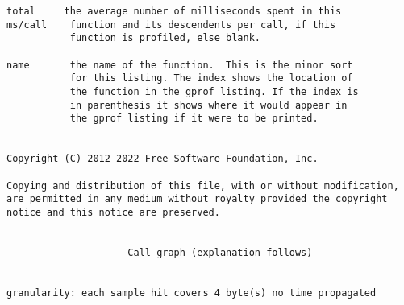 \documentclass[12pt]{article}
\begin{document}
\begin{lstlisting}[breaklines]
 total     the average number of milliseconds spent in this
ms/call    function and its descendents per call, if this
           function is profiled, else blank.

name       the name of the function.  This is the minor sort
           for this listing. The index shows the location of
           the function in the gprof listing. If the index is
           in parenthesis it shows where it would appear in
           the gprof listing if it were to be printed.


Copyright (C) 2012-2022 Free Software Foundation, Inc.

Copying and distribution of this file, with or without modification,
are permitted in any medium without royalty provided the copyright
notice and this notice are preserved.


                     Call graph (explanation follows)


granularity: each sample hit covers 4 byte(s) no time propagated


\end{lstlisting}
\end{document}

